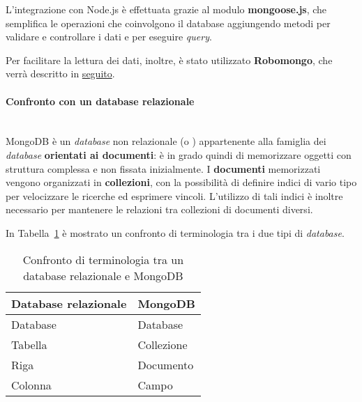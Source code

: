 L'integrazione con Node.js è effettuata grazie al modulo \textbf{mongoose.js}, che semplifica le operazioni che coinvolgono il database aggiungendo metodi per validare e controllare i dati e per eseguire \textit{query}. 

Per facilitare la lettura dei dati, inoltre, è stato utilizzato \textbf{Robomongo}, che verrà descritto in \hyperref[sec:robomongo]{seguito}.

\paragraph{Confronto con un database relazionale} \mbox{} \\
MongoDB è un \textit{database} non relazionale (o ) appartenente alla famiglia dei \textit{database} \textbf{orientati ai documenti}: è in grado quindi di memorizzare oggetti con struttura complessa e non fissata inizialmente. I \textbf{documenti} memorizzati vengono organizzati in \textbf{collezioni}, con la possibilità di definire indici di vario tipo per velocizzare le ricerche ed esprimere vincoli. L'utilizzo di tali indici è inoltre necessario per mantenere le relazioni tra collezioni di documenti diversi.

In Tabella~\ref{tab:terminiSQLNoSQL} è mostrato un confronto di terminologia tra i due tipi di \textit{database}.
\begin{table}[h]
\centering
\caption{Confronto di terminologia tra un database relazionale e MongoDB}
\label{tab:terminiSQLNoSQL}
\begin{tabular}{|l|l|}
\hline
\textbf{Database relazionale} & \textbf{MongoDB} \\ \hline
Database                      & Database         \\ \hline
Tabella                       & Collezione       \\ \hline
Riga                          & Documento        \\ \hline
Colonna                       & Campo	         \\ \hline
\end{tabular}
\end{table}

\newpage
